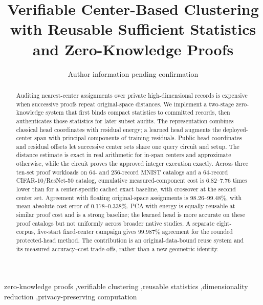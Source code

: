 \documentclass[5p,times,twocolumn]{elsarticle}
\theoremstyle{plain}
\theoremstyle{definition}
\theoremstyle{remark}
\begin{document}
\begin{frontmatter}
\title{\textcolor{RevisionRed}{Verifiable Center-Based Clustering with Reusable Sufficient Statistics and Zero-Knowledge Proofs}}
\author{\textcolor{RevisionRed}{Author information pending confirmation}}
\begin{abstract}\color{RevisionRed}
Auditing nearest-center assignments over private high-dimensional records is expensive when successive proofs repeat original-space distances. We implement a two-stage zero-knowledge system that first binds compact statistics to committed records, then authenticates those statistics for later subset audits. The representation combines classical head coordinates with residual energy; a learned head augments the deployed-center span with principal components of training residuals. Public head coordinates and residual offsets let successive center sets share one query circuit and setup. The distance estimate is exact in real arithmetic for in-span centers and approximate otherwise, while the circuit proves the approved integer execution exactly. Across three ten-set proof workloads on 64- and 256-record MNIST catalogs and a 64-record CIFAR-10/ResNet-50 catalog, cumulative measured-component cost is 6.82--7.76 times lower than for a center-specific cached exact baseline, with crossover at the second center set. Agreement with floating original-space assignments is 98.26--99.48\%, with mean absolute cost error of 0.178--0.338\%. PCA with energy is equally reusable at similar proof cost and is a strong baseline; the learned head is more accurate on these proof catalogs but not uniformly across broader native studies. A separate eight-corpus, five-start fixed-center campaign gives 99.987\% agreement for the rounded protected-head method. The contribution is an original-data-bound reuse system and its measured accuracy--cost trade-offs, rather than a new geometric identity.
\end{abstract}
\begin{keyword}\color{RevisionRed}
zero-knowledge proofs \sep verifiable clustering \sep reusable statistics \sep dimensionality reduction \sep privacy-preserving computation
\end{keyword}
\end{frontmatter}
\medskip
\end{document}

